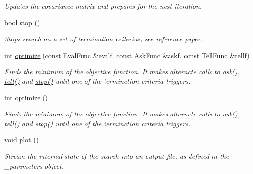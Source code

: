 \begin{DoxyCompactItemize}
\begin{DoxyCompactList}\small\item\em Updates the covariance matrix and prepares for the next iteration. \end{DoxyCompactList}\item 
bool \hyperlink{classlibcmaes_1_1CMAStrategy_adc87b9c500959c800b6bc93d89432ecc}{stop} ()
\begin{DoxyCompactList}\small\item\em Stops search on a set of termination criterias, see reference paper. \end{DoxyCompactList}\item 
int \hyperlink{classlibcmaes_1_1CMAStrategy_a920d0459bf636132528e81736175a1d9}{optimize} (const Eval\+Func \&evalf, const Ask\+Func \&askf, const Tell\+Func \&tellf)
\begin{DoxyCompactList}\small\item\em Finds the minimum of the objective function. It makes alternate calls to \hyperlink{classlibcmaes_1_1CMAStrategy_ab7266bc50732458ffcab690bc26380e6}{ask()}, \hyperlink{classlibcmaes_1_1CMAStrategy_a03d9a4f9338ccd55141323ca309dbdfa}{tell()} and \hyperlink{classlibcmaes_1_1CMAStrategy_adc87b9c500959c800b6bc93d89432ecc}{stop()} until one of the termination criteria triggers. \end{DoxyCompactList}\item 
int \hyperlink{classlibcmaes_1_1CMAStrategy_a68cb0023f51e2824758b1bd1c7512f39}{optimize} ()
\begin{DoxyCompactList}\small\item\em Finds the minimum of the objective function. It makes alternate calls to \hyperlink{classlibcmaes_1_1CMAStrategy_ab7266bc50732458ffcab690bc26380e6}{ask()}, \hyperlink{classlibcmaes_1_1CMAStrategy_a03d9a4f9338ccd55141323ca309dbdfa}{tell()} and \hyperlink{classlibcmaes_1_1CMAStrategy_adc87b9c500959c800b6bc93d89432ecc}{stop()} until one of the termination criteria triggers. \end{DoxyCompactList}\item 
\hypertarget{classlibcmaes_1_1CMAStrategy_a5e56719b620697538d5abe52b5f59b67}{void \hyperlink{classlibcmaes_1_1CMAStrategy_a5e56719b620697538d5abe52b5f59b67}{plot} ()}\label{classlibcmaes_1_1CMAStrategy_a5e56719b620697538d5abe52b5f59b67}

\begin{DoxyCompactList}\small\item\em Stream the internal state of the search into an output file, as defined in the \+\_\+parameters object. \end{DoxyCompactList}\end{DoxyCompactItemize}
